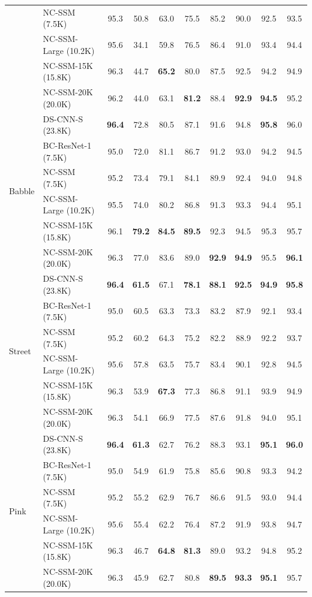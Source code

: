 \documentclass[journal]{IEEEtran}
\begin{document}
\begin{table}[t]
\begin{tabular}{ll|cccccccc}
  & NC-SSM (7.5K)          & 95.3 & 50.8 & 63.0 & 75.5 & 85.2 & 90.0 & 92.5 & 93.5 \\
  & NC-SSM-Large (10.2K)   & 95.6 & 34.1 & 59.8 & 76.5 & 86.4 & 91.0 & 93.4 & 94.4 \\
  & NC-SSM-15K (15.8K) & 96.3 & 44.7 & \textbf{65.2} & 80.0 & 87.5 & 92.5 & 94.2 & 94.9 \\
  & NC-SSM-20K (20.0K) & 96.2 & 44.0 & 63.1 & \textbf{81.2} & 88.4 & \textbf{92.9} & \textbf{94.5} & 95.2 \\
\midrule
\multirow{6}{*}{Babble}
  & DS-CNN-S (23.8K)       & \textbf{96.4} & 72.8 & 80.5 & 87.1 & 91.6 & 94.8 & \textbf{95.8} & 96.0 \\
  & BC-ResNet-1 (7.5K)     & 95.0 & 72.0 & 81.1 & 86.7 & 91.2 & 93.0 & 94.2 & 94.5 \\
\cmidrule{2-10}
  & NC-SSM (7.5K)          & 95.2 & 73.4 & 79.1 & 84.1 & 89.9 & 92.4 & 94.0 & 94.8 \\
  & NC-SSM-Large (10.2K)   & 95.5 & 74.0 & 80.2 & 86.8 & 91.3 & 93.3 & 94.4 & 95.1 \\
  & NC-SSM-15K (15.8K) & 96.1 & \textbf{79.2} & \textbf{84.5} & \textbf{89.5} & 92.3 & 94.5 & 95.3 & 95.7 \\
  & NC-SSM-20K (20.0K) & 96.3 & 77.0 & 83.6 & 89.0 & \textbf{92.9} & \textbf{94.9} & 95.5 & \textbf{96.1} \\
\midrule
\multirow{6}{*}{Street}
  & DS-CNN-S (23.8K)       & \textbf{96.4} & \textbf{61.5} & 67.1 & \textbf{78.1} & \textbf{88.1} & \textbf{92.5} & \textbf{94.9} & \textbf{95.8} \\
  & BC-ResNet-1 (7.5K)     & 95.0 & 60.5 & 63.3 & 73.3 & 83.2 & 87.9 & 92.1 & 93.4 \\
\cmidrule{2-10}
  & NC-SSM (7.5K)          & 95.2 & 60.2 & 64.3 & 75.2 & 82.2 & 88.9 & 92.2 & 93.7 \\
  & NC-SSM-Large (10.2K)   & 95.6 & 57.8 & 63.5 & 75.7 & 83.4 & 90.1 & 92.8 & 94.5 \\
  & NC-SSM-15K (15.8K) & 96.3 & 53.9 & \textbf{67.3} & 77.3 & 86.8 & 91.1 & 93.9 & 94.9 \\
  & NC-SSM-20K (20.0K) & 96.3 & 54.1 & 66.9 & 77.5 & 87.6 & 91.8 & 94.0 & 95.1 \\
\midrule
\multirow{6}{*}{Pink}
  & DS-CNN-S (23.8K)       & \textbf{96.4} & \textbf{61.3} & 62.7 & 76.2 & 88.3 & 93.1 & \textbf{95.1} & \textbf{96.0} \\
  & BC-ResNet-1 (7.5K)     & 95.0 & 54.9 & 61.9 & 75.8 & 85.6 & 90.8 & 93.3 & 94.2 \\
\cmidrule{2-10}
  & NC-SSM (7.5K)          & 95.2 & 55.2 & 62.9 & 76.7 & 86.6 & 91.5 & 93.0 & 94.4 \\
  & NC-SSM-Large (10.2K)   & 95.6 & 55.4 & 62.2 & 76.4 & 87.2 & 91.9 & 93.8 & 94.7 \\
  & NC-SSM-15K (15.8K) & 96.3 & 46.7 & \textbf{64.8} & \textbf{81.3} & 89.0 & 93.2 & 94.8 & 95.2 \\
  & NC-SSM-20K (20.0K) & 96.3 & 45.9 & 62.7 & 80.8 & \textbf{89.5} & \textbf{93.3} & \textbf{95.1} & 95.7 \\
\bottomrule
\end{tabular}
\end{table}
\end{document}

